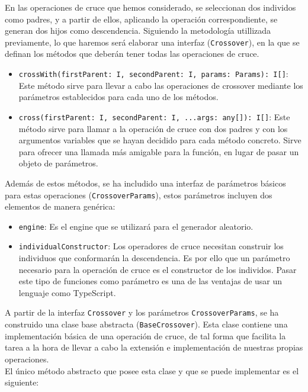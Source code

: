 En las operaciones de cruce que hemos considerado, se seleccionan dos individos como padres, y a partir de ellos, aplicando la operación correspondiente, se generan dos hijos como descendencia. Siguiendo la metodología utillizada previamente, lo que haremos será elaborar una interfaz (\texttt{Crossover}), en la que se definan los métodos que deberán tener todas las operaciones de cruce.

\begin{itemize}
    \item \texttt{crossWith(firstParent: I, secondParent: I, params: Params): I[]}: Este método sirve para llevar a cabo las operaciones de crossover mediante los parámetros establecidos para cada uno de los métodos.
    \item \texttt{cross(firstParent: I, secondParent: I, ...args: any[]): I[]}: Este método sirve para llamar a la operación de cruce con dos padres y con los argumentos variables que se hayan decidido para cada método concreto. Sirve para ofrecer una llamada más amigable para la función, en lugar de pasar un objeto de parámetros.
\end{itemize}

Además de estos métodos, se ha includido una interfaz de parámetros básicos para estas operaciones (\texttt{CrossoverParams}), estos parámetros incluyen dos elementos de manera genérica:

\begin{itemize}
    \item \texttt{engine}: Es el engine que se utilizará para el generador aleatorio.
    \item \texttt{individualConstructor}: Los operadores de cruce necesitan construir los individuos que conformarán la descendencia. Es por ello que un parámetro necesario para la operación de cruce es el constructor de los individos. Pasar este tipo de funciones como parámetro es una de las ventajas de usar un lenguaje como TypeScript.
\end{itemize}

A partir de la interfaz \texttt{Crossover} y los parámetros \texttt{CrossoverParams}, se ha construido una clase base abstracta (\texttt{BaseCrossover}). Esta clase contiene una implementación básica de una operación de cruce, de tal forma que facilita la tarea a la hora de llevar a cabo la extensión e implementación de nuestras propias operaciones. \\

El único método abstracto que posee esta clase y que se puede implementar es el siguiente:

